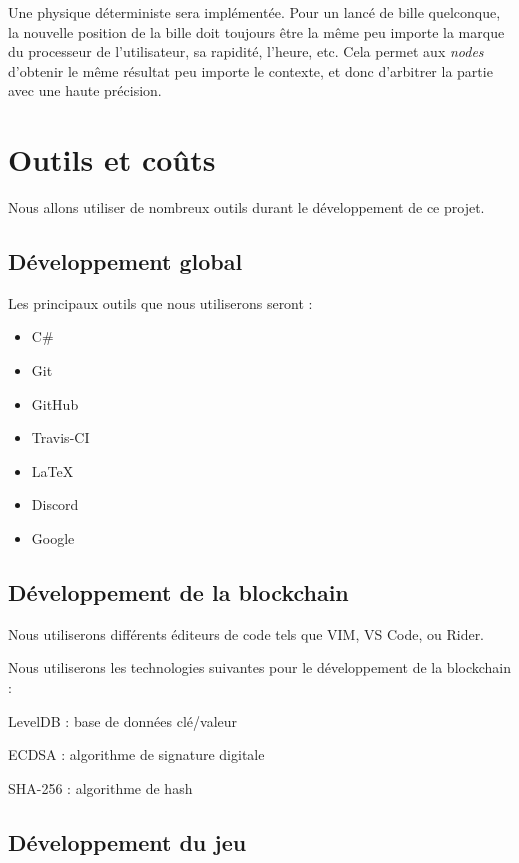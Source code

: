 \documentclass{article}
\begin{document}
Une physique déterministe sera implémentée. Pour un lancé de bille quelconque, la nouvelle position de la bille doit toujours être la même peu importe la marque du processeur de l'utilisateur, sa rapidité, l'heure, etc. Cela permet aux \textit{nodes} d'obtenir le même résultat peu importe le contexte, et donc d'arbitrer la partie avec une haute précision.


\section{Outils et coûts}
Nous allons utiliser de nombreux outils durant le développement de ce projet.

\subsection{Développement global}
Les principaux outils que nous utiliserons seront :

\begin{itemize}
    \item C\#
    \item Git
    \item GitHub
    \item Travis-CI
    \item \LaTeX
    \item Discord
    \item Google

\end{itemize}

\subsection{Développement de la blockchain}
Nous utiliserons différents éditeurs de code tels que VIM, VS Code, ou Rider.

Nous utiliserons les technologies suivantes pour le développement de la blockchain :
\begin{itemize}
\begin{samepage}
    \item LevelDB : base de données clé/valeur
    \item ECDSA : algorithme de signature digitale
    \item SHA-256 : algorithme de hash
\end{samepage}
\end{itemize}

\subsection{Développement du jeu}
\end{document}
